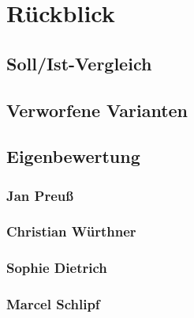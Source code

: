 \chapter{Rückblick}

\section{Soll/Ist-Vergleich}

\section{Verworfene Varianten}

\section{Eigenbewertung}

\subsection{Jan Preuß}

\subsection{Christian Würthner}

\subsection{Sophie Dietrich}

\subsection{Marcel Schlipf}